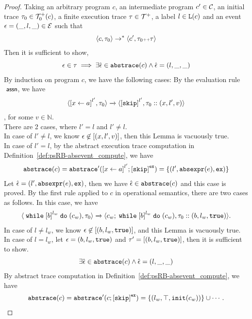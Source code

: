   \begin{proof}
    Taking an arbitrary program $c$, an intermediate program $c' \in \mathcal{C}$, an initial trace $\mathtt{\tau}_0 \in \mathcal{T}^{+}_0(c)$,  a finite execution trace $\mathtt{\tau} \in \mathcal{T}^{+}$, a label $l \in \mathtt{L}(c)$ and an event $\mathtt{\epsilon} = (\_, l, \_) \in \mathcal{E}$
    such that
    \[
      \langle {c}, \mathtt{\tau}_0 \rangle \to^{*} \langle c', \mathtt{\tau}_0 {\scriptscriptstyle ++} \mathtt{\tau} \rangle 
    \]
    Then it is sufficient to show,
    \[
      \mathtt{\epsilon} \in \mathtt{\tau}
      \implies
      \exists \hat{\mathtt{\epsilon}{}} \in \mathtt{abs}{\mathtt{trace}}(c) \land \hat{\mathtt{\epsilon}{}} = (l, \_, \_)
    \]
    By induction on program $c$, we have the following cases:
    By the evaluation rule $\textsf{\small{ assn}}$, we have
    \[
    {
    \config{\clabel{\assign{{x}}{\aexpr}}^{l'},  \trace_0 } 
    \xrightarrow{} 
    \config{\clabel{\eskip}^{l'}, \trace_0 :: ({x}, l', v)}
    }\], for some $v \in \mathbb{N}$.
    \\
    There are 2 cases, where $l' = l$ and $l' \neq l$.
    \\
    In case of $l' \neq l$, we know $\mathtt{\epsilon} \not\in [({x}, l', v)]$, then this Lemma is vacuously true.
    \\
    In case of $l' = l$, by the abstract execution trace computation in Definition~\ref{def:psRB-absevent_compute}, we have 
    \[
      \absflow(c) = \absflow'(\clabel{\assign{{x}}{\aexpr}}^{l'}; \clabel{\eskip}^{\lex}) = \{(l', \absexpr(\expr), \lex)\}
    \]
    Let $\hat{\mathtt{\epsilon}{}} = (l', \mathtt{abs}{\mathtt{expr}}(e), \mathtt{ex}) $, then we have $\hat{\mathtt{\epsilon}{}} \in \mathtt{abs}{\mathtt{trace}}(c)$ and this case is proved.
    By the first rule applied to $c$ in operational semantics, there are two cases as follows.
    In this case, we have
    \[
      \config{{\ewhile \clabel{b}^{l_w} \edo (c_w), \trace_0}}
      \xrightarrow{} 
      \config{{
      c_w; \ewhile \clabel{b}^{l_w} \edo (c_w),
      \trace_0 :: (b, l_w, \etrue)}}.
    \]
    In case of $l \neq l_w$, we know $\mathtt{\epsilon} \not \in [(b, l_w, \mathtt{true})]$, and this Lemma is vacuously true.
    \\
    In case of $l = l_w$, let $\mathtt{\epsilon} = (b, l_w, \mathtt{true})$ and $\mathtt{\tau}' =  [(b, l_w, \mathtt{true})]$, then it is sufficient to show.
      \[
        \exists 
        \hat{\mathtt{\epsilon}{}} \in \mathtt{abs}{\mathtt{trace}}(c) \land \hat{\mathtt{\epsilon}{}} = (l, \_, \_)
      \]
      By abstract trace computation in Definition~\ref{def:psRB-absevent_compute}, we have
      \[
        \absflow(c) = \absflow'(c; \clabel{\eskip}^{\lex}) = \{(l_w, \top, \init(c_w))\} \cup \cdots.
\]
\end{proof}
